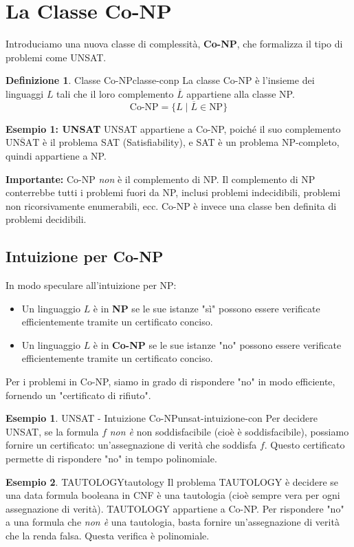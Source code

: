 \documentclass[a4paper]{article}
\theoremstyle{definition} %
\newtheorem{definition}{Definizione}
\newtheorem{example}{Esempio}
\begin{document}
\section{La Classe Co-NP}

Introduciamo una nuova classe di complessità, \textbf{Co-NP}, che formalizza il tipo di problemi come UNSAT.

\begin{definition}{Classe Co-NP}{classe-conp}
La classe Co-NP è l'insieme dei linguaggi $L$ tali che il loro complemento $\overline{L}$ appartiene alla classe NP.
\[
\text{Co-NP} = \{ L \mid \overline{L} \in \text{NP} \}
\]
\end{definition}

\textbf{Esempio 1: UNSAT}
UNSAT appartiene a Co-NP, poiché il suo complemento $\overline{\text{UNSAT}}$ è il problema SAT (Satisfiability), e SAT è un problema NP-completo, quindi appartiene a NP.

\textbf{Importante:} Co-NP \textit{non} è il complemento di NP. Il complemento di NP conterrebbe tutti i problemi fuori da NP, inclusi problemi indecidibili, problemi non ricorsivamente enumerabili, ecc. Co-NP è invece una classe ben definita di problemi decidibili.

\subsection{Intuizione per Co-NP}
In modo speculare all'intuizione per NP:
\begin{itemize}
    \item Un linguaggio $L$ è in \textbf{NP} se le sue istanze "sì" possono essere verificate efficientemente tramite un certificato conciso.
    \item Un linguaggio $L$ è in \textbf{Co-NP} se le sue istanze "no" possono essere verificate efficientemente tramite un certificato conciso.
\end{itemize}
Per i problemi in Co-NP, siamo in grado di rispondere "no" in modo efficiente, fornendo un "certificato di rifiuto".

\begin{example}{UNSAT - Intuizione Co-NP}{unsat-intuizione-con}
Per decidere UNSAT, se la formula $f$ \textit{non è} non soddisfacibile (cioè è soddisfacibile), possiamo fornire un certificato: un'assegnazione di verità che soddisfa $f$. Questo certificato permette di rispondere "no" in tempo polinomiale.
\end{example}

\begin{example}{TAUTOLOGY}{tautology}
Il problema TAUTOLOGY è decidere se una data formula booleana in CNF è una tautologia (cioè sempre vera per ogni assegnazione di verità).
TAUTOLOGY appartiene a Co-NP. Per rispondere "no" a una formula che \textit{non è} una tautologia, basta fornire un'assegnazione di verità che la renda falsa. Questa verifica è polinomiale.
\end{example}
\end{document}
